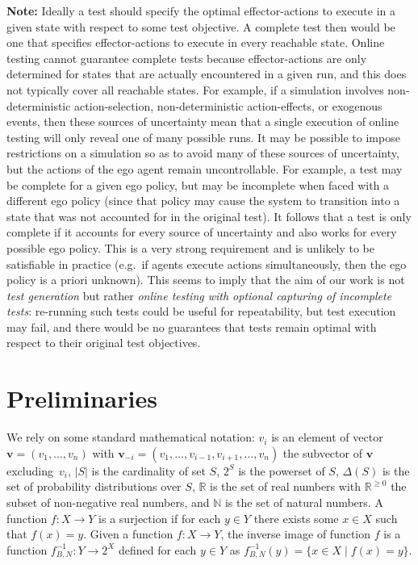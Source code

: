 \documentclass[10pt]{article}
\theoremstyle{plain}
\newcommand{\vect}[1]{\bm{#1}}
\newenvironment{note}[1][Note]{
    \begin{center}
    	\begin{minipage}{0.9\linewidth}
    		\begin{mdframed}[backgroundcolor=yellow!25,linewidth=0pt]
    			\textbf{#1:} }{
    		\end{mdframed}
    	\end{minipage}
    \end{center}
}
\begin{document}
\begin{note}
    Ideally a test should specify the optimal effector-actions to execute in a given state with respect to some test objective.
    A complete test then would be one that specifies effector-actions to execute in every reachable state.
    Online testing cannot guarantee complete tests because effector-actions are only determined for states that are actually encountered in a given run, and this does not typically cover all reachable states.
    For example, if a simulation involves non-deterministic action-selection, non-deterministic action-effects, or exogenous events, then these sources of uncertainty mean that a single execution of online testing will only reveal one of many possible runs.
    It may be possible to impose restrictions on a simulation so as to avoid many of these sources of uncertainty, but the actions of the ego agent remain uncontrollable.
    For example, a test may be complete for a given ego policy, but may be incomplete when faced with a different ego policy (since that policy may cause the system to transition into a state that was not accounted for in the original test).
    It follows that a test is only complete if it accounts for every source of uncertainty and also works for every possible ego policy.
    This is a very strong requirement and is unlikely to be satisfiable in practice (e.g.\ if agents execute actions simultaneously, then the ego policy is a priori unknown).
    This seems to imply that the aim of our work is not \emph{test generation} but rather \emph{online testing with optional capturing of incomplete tests}: re-running such tests could be useful for repeatability, but test execution may fail, and there would be no guarantees that tests remain optimal with respect to their original test objectives.
\end{note}

\newpage
\section{Preliminaries}
We rely on some standard mathematical notation:
$v_{i}$ is an element of vector $\vect{v} = (v_{1}, \dots, v_{n})$ with $\vect{v}_{-i} = (v_{1}, \dots, v_{i-1}, v_{i+1}, \dots, v_ {n})$ the subvector of $\vect{v}$ excluding~$v_{i}$,
$|S|$ is the cardinality of set $S$,
$2^{S}$ is the powerset of $S$,
$\Delta(S)$ is the set of probability distributions over $S$,
$\mathbb{R}$ is the set of real numbers with $\mathbb{R}^{\ge 0}$ the subset of non-negative real numbers,
and $\mathbb{N}$ is the set of natural numbers.
A function $f : X \to Y$ is a surjection if for each $y \in Y$ there exists some $x \in X$ such that $f(x) = y$.
Given a function $f : X \to Y$, the inverse image of function $f$ is a function $f_{B,N}^{-1} : Y \to 2^{X}$ defined for each $y \in Y$ as $f_{B,N}^{-1}(y) = \{ x \in X \mid f(x) = y \}$.
\end{document}
